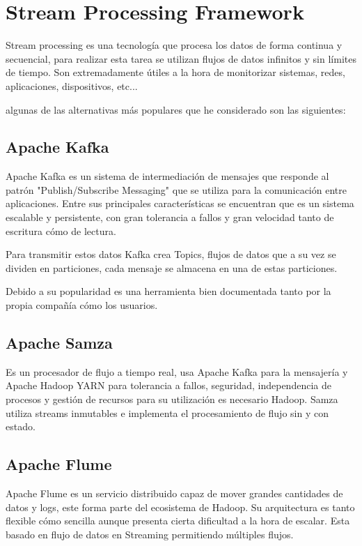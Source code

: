
\section{Stream Processing Framework}

Stream processing es una tecnología que procesa los datos de forma continua y secuencial, para realizar esta tarea se utilizan flujos de datos infinitos y sin límites de tiempo. Son extremadamente útiles a la hora de monitorizar sistemas, redes, aplicaciones, dispositivos, etc... 

algunas de las alternativas más populares que he considerado son las siguientes:

\subsection{Apache Kafka}

Apache Kafka es un sistema de intermediación de mensajes que responde al patrón "Publish/Subscribe Messaging" que se utiliza para la comunicación entre aplicaciones. Entre sus principales características se encuentran que es un sistema escalable y persistente, con gran tolerancia a fallos y gran velocidad tanto de escritura cómo de lectura.

Para transmitir estos datos Kafka crea Topics, flujos de datos que a su vez se dividen en particiones, cada mensaje se almacena en una de estas particiones.

Debido a su popularidad es una herramienta bien documentada \cite{documentacion:kafka} tanto por la propia compañía cómo los usuarios. \cite{pagina:kafka}

\subsection{Apache Samza}
Es un procesador de flujo a tiempo real, usa Apache Kafka para la mensajería y Apache Hadoop YARN para tolerancia a fallos, seguridad, independencia de procesos y gestión de recursos para su utilización es necesario Hadoop. Samza utiliza streams inmutables e implementa el procesamiento de flujo sin y con estado. \cite{pagina:Samza}

\subsection{Apache Flume}

Apache Flume es un servicio distribuido capaz de mover grandes cantidades de datos y logs, este forma parte del ecosistema de Hadoop. Su arquitectura es tanto flexible cómo sencilla aunque presenta cierta dificultad a la hora de escalar. Esta basado en flujo de datos en Streaming permitiendo múltiples flujos.\cite{pagina:Flume}
